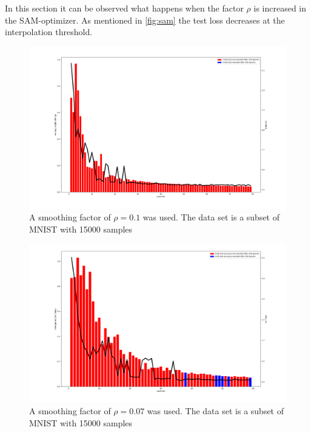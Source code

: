 In this section it can be observed what happens when the factor $\rho$ is increased in the SAM-optimizer. As mentioned in \ref{fig:sam} the test loss decreases at the interpolation threshold.

\begin{figure}[!htp]
\centering
\includegraphics[width= 0.8\linewidth]{Abschlussarbeit_2021/LaTeX/images/sam_weigthchange.png}
\caption{A smoothing factor of $\rho = 0.1$
was used. The data set is a subset of MNIST with 15000 samples}
\label{more_noise_can_hurt}
\end{figure}

\begin{figure}[!htp]
\centering
\includegraphics[width= 0.8\linewidth]{Abschlussarbeit_2021/LaTeX/images/sam_loss4_.png}
\caption{A smoothing factor of $\rho = 0.07$
was used. The data set is a subset of MNIST with 15000 samples}
\label{more_noise_can_hurt}
\end{figure}


















